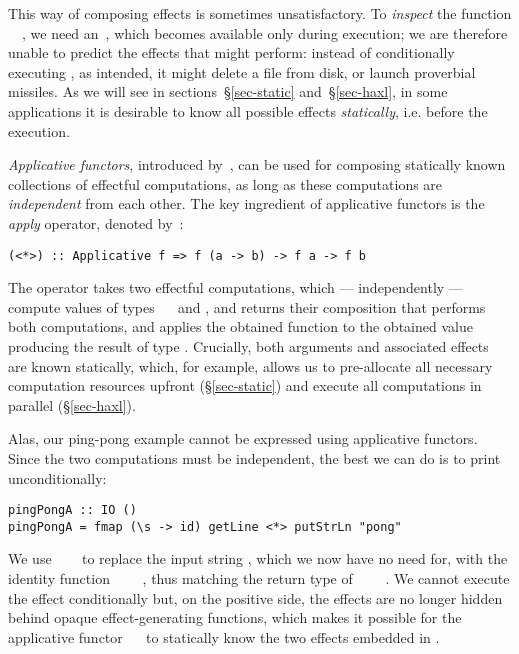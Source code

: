 This way of composing effects is sometimes unsatisfactory. To \emph{inspect} the
function \hs{\s}~\hs{->}~, we need an~, which becomes available
only during execution; we are therefore unable to predict the effects that
 might perform: instead of conditionally executing ,
as intended, it might delete a file from disk, or launch proverbial missiles. As
we will see in sections~\S\ref{sec-static} and~\S\ref{sec-haxl}, in some
applications it is desirable to know all possible effects \emph{statically},
i.e. before the execution.

\emph{Applicative functors}, introduced by~\citet{mcbride2008applicative}, can
be used for composing statically known collections of effectful computations, as
long as these computations are \emph{independent} from each other. The key
ingredient of applicative functors is the \emph{apply} operator, denoted
by~\hs{<*>}:

\vspace{1mm}
\begin{verbatim}
(<*>) :: Applicative f => f (a -> b) -> f a -> f b
\end{verbatim}
\vspace{1mm}
\newpage

\noindent
The operator takes two effectful computations, which --- independently ---
compute values of types ~\hs{->}~ and , and returns their
composition that performs both computations, and applies the obtained function
to the obtained value producing the result of type . Crucially, both
arguments and associated effects are known statically, which, for example,
allows us to pre-allocate all necessary computation resources upfront
(\S\ref{sec-static}) and execute all computations in parallel
(\S\ref{sec-haxl}).

Alas, our ping-pong example cannot be expressed using applicative functors.
Since the two computations must be independent, the best we can do is to print
 unconditionally:

\vspace{0.5mm}
\begin{verbatim}
pingPongA :: IO ()
pingPongA = fmap (\s -> id) getLine <*> putStrLn "pong"
\end{verbatim}
\vspace{0.5mm}

\noindent
We use ~\hs{(\s}~\hs{->}~ to replace the input string ,
which we now have no need for, with the identity function
~\hs{::}~\hs{()}~\hs{->}~\hs{()}, thus matching the return type of
~~\hs{::}~~\hs{()}. We cannot execute the
 effect conditionally but, on the positive side, the effects are no
longer hidden behind opaque effect-generating functions, which makes it possible
for the applicative functor ~\hs{=}~ to statically know the two
effects embedded in .

